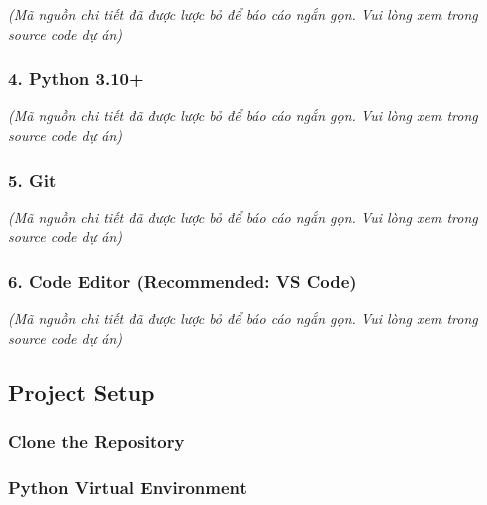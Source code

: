 \emph{(Mã nguồn chi tiết đã được lược bỏ để báo cáo ngắn gọn. Vui lòng
xem trong source code dự án)}

\hypertarget{python-3.10}{%
\subsubsection{4. Python 3.10+}}

\emph{(Mã nguồn chi tiết đã được lược bỏ để báo cáo ngắn gọn. Vui lòng
xem trong source code dự án)}

\hypertarget{git}{%
\subsubsection{5. Git}}

\emph{(Mã nguồn chi tiết đã được lược bỏ để báo cáo ngắn gọn. Vui lòng
xem trong source code dự án)}

\hypertarget{code-editor-recommended-vs-code}{%
\subsubsection{6. Code Editor (Recommended: VS
Code)}}

\emph{(Mã nguồn chi tiết đã được lược bỏ để báo cáo ngắn gọn. Vui lòng
xem trong source code dự án)}

\hypertarget{project-setup}{%
\subsection{Project Setup}}

\hypertarget{clone-the-repository}{%
\subsubsection{Clone the Repository}}

\begin{Shaded}
\begin{Highlighting}[]
\OperatorTok{\textless{}}\OperatorTok{\textgreater{}}
\end{Highlighting}
\end{Shaded}

\hypertarget{python-virtual-environment}{%
\subsubsection{Python Virtual
Environment}}

